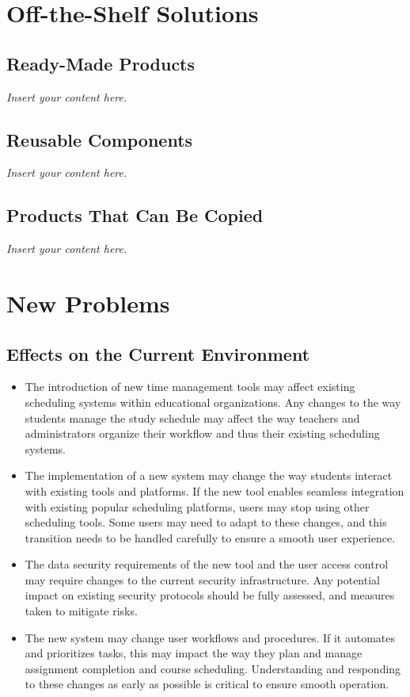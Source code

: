 \documentclass[12pt]{article}
\newcommand{\lips}{\textit{Insert your content here.}}
\begin{document}
\section{Off-the-Shelf Solutions}
\subsection{Ready-Made Products}
\lips
\subsection{Reusable Components}
\lips
\subsection{Products That Can Be Copied}
\lips

\section{New Problems}
\subsection{Effects on the Current Environment}

\begin{itemize}
    \item The introduction of new time management tools may affect existing scheduling systems within educational organizations. Any changes to the way students manage the study schedule may affect the way teachers and administrators organize their workflow and thus their existing scheduling systems.

    \item The implementation of a new system may change the way students interact with existing tools and platforms. If the new tool enables seamless integration with existing popular scheduling platforms, users may stop using other scheduling tools. Some users may need to adapt to these changes, and this transition needs to be handled carefully to ensure a smooth user experience.

    \item The data security requirements of the new tool and the user access control may require changes to the current security infrastructure. Any potential impact on existing security protocols should be fully assessed, and measures taken to mitigate risks.

    \item The new system may change user workflows and procedures. If it automates and prioritizes tasks, this may impact the way they plan and manage assignment completion and course scheduling. Understanding and responding to these changes as early as possible is critical to ensure smooth operation.
\end{itemize}
\end{document}
